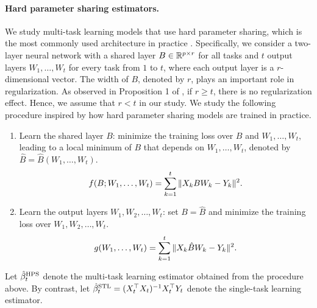 \paragraph{Hard parameter sharing estimators.}
We study multi-task learning models that use hard parameter sharing, which is the most commonly used architecture in practice \cite{R17}.
Specifically, we consider a two-layer neural network with a shared layer $B\in\mathbb{R}^{p\times r}$ for all tasks and $t$ output layers $W_1, \dots, W_t$ for every task from $1$ to $t$, where each output layer is a $r$-dimensional vector.
The width of $B$, denoted by $r$, plays an important role in regularization.
As observed in Proposition 1 of \citet{WZR20}, if $r \ge t$, there is no regularization effect.
Hence, we assume that $r < t$ in our study.
We study the following procedure inspired by how hard parameter sharing models are trained in practice.
\begin{enumerate}
	\item Learn the shared layer $B$: minimize the training loss over $B$ and $W_1, \dots, W_t$, leading to a local minimum of $B$ that depends on $W_1, \dots, W_t$, denoted by $\hat{B} = \hat{B}(W_1, \dots, W_t)$.
		{\begin{align}\label{eq_mtl}
			f(B; W_1, \dots, W_t) = \sum_{k=1}^t \|X_k B W_k - Y_k\|^2.
		\end{align}}
	\item Learn the output layers $W_1, W_2, \dots, W_t$: set $B = \hat{B}$ and minimize the training loss over $W_1, W_2, \dots, W_t$.
		{\begin{align}\label{eq_mtl_eval}
			g(W_1, \dots, W_t) = \sum_{k=1}^t \|X_k \hat{B} W_k - Y_k\|^2.
		\end{align}}
\end{enumerate}
Let $\hat{\beta}_t^{\textup{HPS}}$ denote the multi-task learning estimator obtained from the procedure above.
By contrast, let $\hat{\beta}_t^{\textup{STL}} = (X_t^{\top}X_t)^{-1}X_t^{\top}{Y_t}$ denote the single-task learning estimator. %

